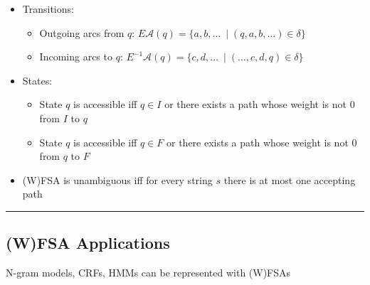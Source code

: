 \begin{itemize}
    \item Transitions:
    \begin{itemize}
        \item Outgoing arcs from $q$: $E \mathcal{A} (q) = \{a, b, \ldots\ \mid (q, a, b, \ldots) \in \delta\}$
        \item Incoming arcs to $q$: $E^{-1} \mathcal{A} (q) = \{c, d, \ldots\ \mid (\ldots, c, d, q) \in \delta\}$
    \end{itemize}

    \item States:
    \begin{itemize}
        \item State $q$ is accessible iff $q \in I$ or there exists a path whose weight is not 0 from $I$ to $q$
        \item State $q$ is accessible iff $q \in F$ or there exists a path whose weight is not 0 from $q$ to $F$
    \end{itemize}

    \item (W)FSA is unambiguous iff for every string $s$ there is at most one accepting path
\end{itemize}

{\color{black}\hrule height 0.001mm}

\subsection*{(W)FSA Applications}
N-gram models, CRFs, HMMs can be represented with (W)FSAs

